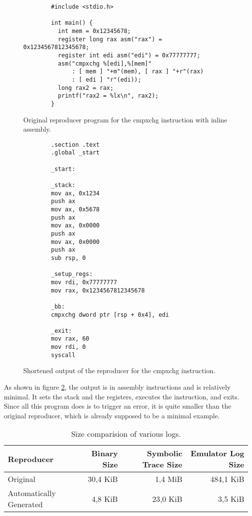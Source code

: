 \begin{figure}[ht]
    \centering
    \begin{verbatim}
        #include <stdio.h>

        int main() {
          int mem = 0x12345678;
          register long rax asm("rax") = 0x1234567812345678;
          register int edi asm("edi") = 0x77777777;
          asm("cmpxchg %[edi],%[mem]"
              : [ mem ] "+m"(mem), [ rax ] "+r"(rax)
              : [ edi ] "r"(edi));
          long rax2 = rax;
          printf("rax2 = %lx\n", rax2);
        }
    \end{verbatim}
    \caption{Original reproducer program for the cmpxchg instruction with inline assembly.}
    \label{fig:c}
\end{figure}

\begin{figure}[ht]
    \centering
    \begin{verbatim}       
        .section .text
        .global _start
        
        _start:
        
        _stack:
        mov ax, 0x1234
        push ax
        mov ax, 0x5678
        push ax
        mov ax, 0x0000
        push ax
        mov ax, 0x0000
        push ax
        sub rsp, 0
        
        _setup_regs:
        mov rdi, 0x77777777
        mov rax, 0x1234567812345678
        
        _bb:
        cmpxchg dword ptr [rsp + 0x4], edi
        
        _exit:
        mov rax, 60
        mov rdi, 0
        syscall
    \end{verbatim}
    \caption{Shortened output of the reproducer for the cmpxchg instruction.}
    \label{fig:gas}
\end{figure}

As shown in figure \ref{fig:gas}, the output is in assembly instructions and is relatively minimal.
It sets the stack and the registers, executes the instruction, and exits.
Since all this program does is to trigger an error, it is quite smaller than the original reproducer, which is already supposed to be a minimal example.

\begin{table}[htpb]
    \caption[Log size comparision]{Size comparision of various logs.}\label{tab:log}
    \centering
    \begin{tabular}{l r r r}
      \toprule
        Reproducer & Binary Size & Symbolic Trace Size & Emulator Log Size \\
      \midrule
        Original & 30,4 KiB & 1,4 MiB & 484,1 KiB \\
        Automatically Generated & 4,8 KiB & 23,0 KiB & 3,5 KiB \\
      \bottomrule
    \end{tabular}
\end{table}


